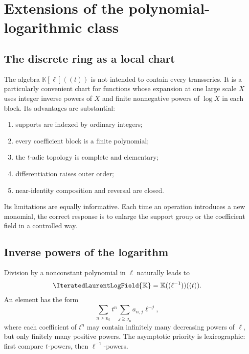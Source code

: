 \documentclass[11pt,oneside,openany]{book}
\newcommand{\K}{\mathbb{K}}
\newcommand{\Fring}{\IteratedLaurentLogField{\K}}
\begin{document}
\chapter{Extensions of the polynomial-logarithmic class}
\label{ch:extensions}

\section{The discrete ring as a local chart}
The algebra \(\K[\ell]((t))\) is not intended to contain every transseries.
It is a particularly convenient chart for functions whose expansion at one
large scale \(X\) uses integer inverse powers of \(X\) and finite nonnegative
powers of \(\log X\) in each block.  Its advantages are substantial:

\begin{enumerate}
\item supports are indexed by ordinary integers;
\item every coefficient block is a finite polynomial;
\item the \(t\)-adic topology is complete and elementary;
\item differentiation raises outer order;
\item near-identity composition and reversal are closed.
\end{enumerate}

Its limitations are equally informative.  Each time an operation introduces a
new monomial, the correct response is to enlarge the support group or the
coefficient field in a controlled way.

\section{Inverse powers of the logarithm}
Division by a nonconstant polynomial in \(\ell\) naturally leads to
\begin{equation}\label{eq:iteratedLaurentagain}
 \Fring=\K((\ell^{-1}))((t)).
\end{equation}
An element has the form
\begin{equation}\label{eq:iteratedLaurentform}
 \sum_{n\geq n_0}t^n
 \sum_{j\geq j_n}a_{n,j}\ell^{-j},
\end{equation}
where each coefficient of \(t^n\) may contain infinitely many decreasing
powers of \(\ell\), but only finitely many positive powers.  The asymptotic
priority is lexicographic: first compare \(t\)-powers, then \(\ell^{-1}\)-powers.
\end{document}
